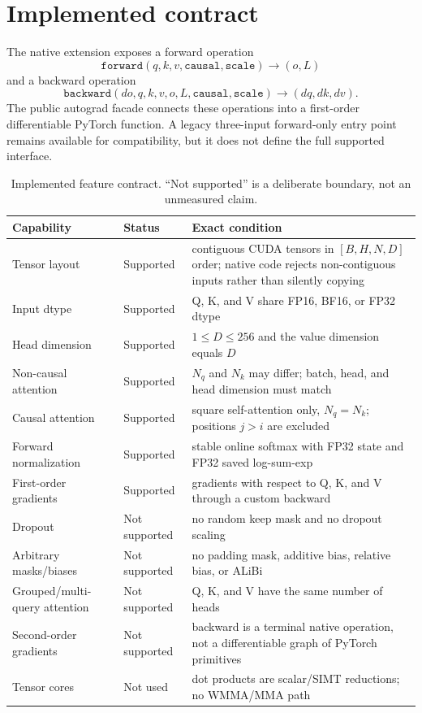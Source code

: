 \section{Implemented contract}
\label{sec:intro-contract}

The native extension exposes a forward operation
\begin{equation*}
  \texttt{forward}(q,k,v,\texttt{causal},\texttt{scale})\longrightarrow(o,L)
\end{equation*}
and a backward operation
\begin{equation*}
  \texttt{backward}(d o,q,k,v,o,L,\texttt{causal},\texttt{scale})
  \longrightarrow(dq,dk,dv).
\end{equation*}
The public autograd facade connects these operations into a first-order differentiable PyTorch function. A legacy three-input forward-only entry point remains available for compatibility, but it does not define the full supported interface.

\begin{table}[htbp]
\centering
\caption{Implemented feature contract. ``Not supported'' is a deliberate boundary, not an unmeasured claim.}
\label{tab:feature-contract}
\begin{tabularx}{\textwidth}{@{}p{} p{} X@{}}
\toprule
Capability & Status & Exact condition \\
\midrule
Tensor layout & Supported & contiguous CUDA tensors in $[B,H,N,D]$ order; native code rejects non-contiguous inputs rather than silently copying \\
Input dtype & Supported & Q, K, and V share FP16, BF16, or FP32 dtype \\
Head dimension & Supported & $1\leq D\leq256$ and the value dimension equals $D$ \\
Non-causal attention & Supported & $N_q$ and $N_k$ may differ; batch, head, and head dimension must match \\
Causal attention & Supported & square self-attention only, $N_q=N_k$; positions $j>i$ are excluded \\
Forward normalization & Supported & stable online softmax with FP32 state and FP32 saved log-sum-exp \\
First-order gradients & Supported & gradients with respect to Q, K, and V through a custom backward \\
Dropout & Not supported & no random keep mask and no dropout scaling \\
Arbitrary masks/biases & Not supported & no padding mask, additive bias, relative bias, or ALiBi \\
Grouped/multi-query attention & Not supported & Q, K, and V have the same number of heads \\
Second-order gradients & Not supported & backward is a terminal native operation, not a differentiable graph of PyTorch primitives \\
Tensor cores & Not used & dot products are scalar/SIMT reductions; no WMMA/MMA path \\
\bottomrule
\end{tabularx}
\end{table}

